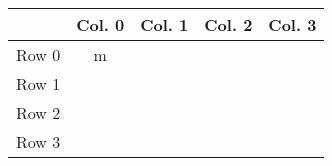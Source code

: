 \documentclass[12pt]{article}
\newenvironment{ex}[2][Exercise]{\begin{trivlist}
		\item[\hskip \labelsep {\bfseries #1}\hskip \labelsep {\bfseries #2.}]}{\end{trivlist}}
\begin{document}
\begin{ex}{6.34}
\begin{center}
\begin{tabular}{ccccc}
			\hline
			{} & Col. 0 & Col. 1 & {} Col. 2 & {} Col. 3\\
			\hline
			Row 0 & m & \makebox[1cm]{\hrulefill} & \makebox[1cm]{\hrulefill} & \makebox[1cm]{\hrulefill}\\
			Row 1 & \makebox[1cm]{\hrulefill} & \makebox[1cm]{\hrulefill} & \makebox[1cm]{\hrulefill} & \makebox[1cm]{\hrulefill}\\
			Row 2 & \makebox[1cm]{\hrulefill} & \makebox[1cm]{\hrulefill} & \makebox[1cm]{\hrulefill} & \makebox[1cm]{\hrulefill}\\
			Row 3 & \makebox[1cm]{\hrulefill} & \makebox[1cm]{\hrulefill} & \makebox[1cm]{\hrulefill} & \makebox[1cm]{\hrulefill}\\
		\end{tabular}
	\end{center}
\end{ex}
\end{document}
